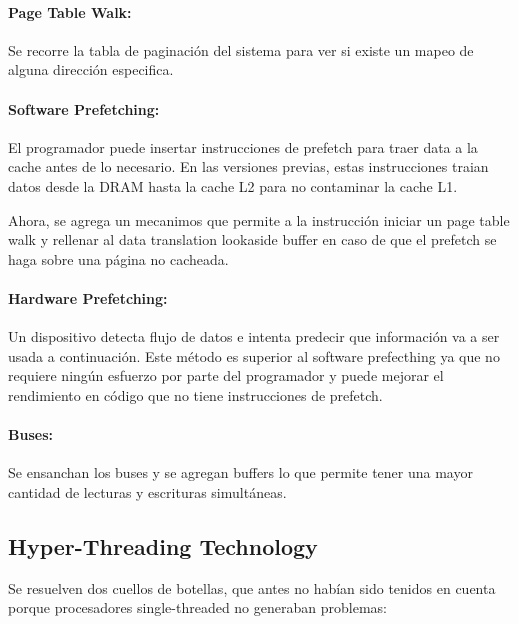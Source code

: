 \paragraph{Page Table Walk:} Se recorre la tabla de paginación del sistema para ver si existe un mapeo de alguna dirección especifica.

\paragraph{Software Prefetching:} El programador puede insertar instrucciones de prefetch para traer data a la cache antes de lo necesario. En las versiones previas, estas instrucciones traian datos desde la DRAM hasta la cache L2 para no contaminar la cache L1.

Ahora, se agrega un mecanimos que permite a la instrucción iniciar un page table walk y rellenar al data translation lookaside buffer en caso de que el prefetch se haga sobre una página no cacheada.

\paragraph{Hardware Prefetching:} Un dispositivo detecta flujo de datos e intenta predecir que información va a ser usada a continuación. Este método es superior al software prefecthing ya que no requiere ningún esfuerzo por parte del programador y puede mejorar el rendimiento en código que no tiene instrucciones de prefetch.

\paragraph{Buses:} Se ensanchan los buses y se agregan buffers lo que permite tener una mayor cantidad de lecturas y escrituras simultáneas.

\subsection{Hyper-Threading Technology}
Se resuelven dos cuellos de botellas, que antes no habían sido tenidos en cuenta porque procesadores single-threaded no generaban problemas:

